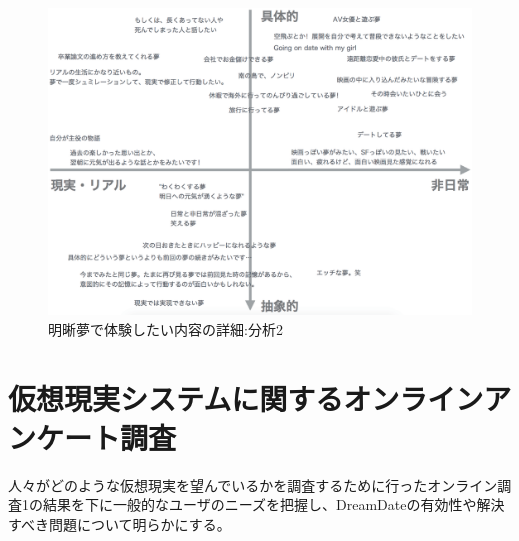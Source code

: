 \begin{figure}[htbp]
\begin{center}
\includegraphics[width=13cm]{eps/whatYouWantToDream.eps}
\caption{明晰夢で体験したい内容の詳細:分析2}
\label{desiredDreamTpye2}
\end{center}
\end{figure}

\section{仮想現実システムに関するオンラインアンケート調査}
人々がどのような仮想現実を望んでいるかを調査するために行ったオンライン調査1の結果を下に一般的なユーザのニーズを把握し、DreamDateの有効性や解決すべき問題について明らかにする。



